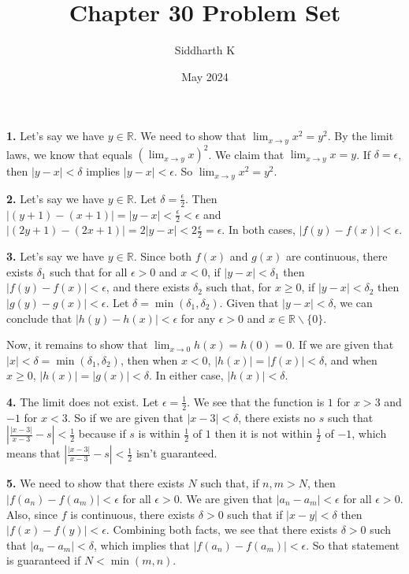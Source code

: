\documentclass{article}
\title{Chapter 30 Problem Set}
\author{Siddharth K}
\date{May 2024}
\begin{document}
\maketitle

\textbf{1.} Let's say we have $y \in \mathbb{R}$. We need to show that $\displaystyle\lim_{x \to y} x^2 = y^2$. By the limit laws, we know that equals $\displaystyle(\lim_{x \to y} x)^2$. We claim that $\displaystyle\lim_{x \to y} x = y$. If $\delta = \epsilon$, then $|y - x| < \delta$ implies $|y - x| < \epsilon$. So $\displaystyle\lim_{x \to y} x^2 = y^2$.
\newline

\textbf{2.} Let's say we have $y \in \mathbb{R}$. Let $\delta = \frac{\epsilon}{2}$. Then $|(y + 1) - (x + 1)| = |y - x| < \frac{\epsilon}{2} < \epsilon$ and $|(2y + 1) - (2x + 1)| = 2|y - x| < 2\frac{\epsilon}{2} = \epsilon$. In both cases, $|f(y) - f(x)| < \epsilon$.
\newline

\textbf{3.} Let's say we have $y \in \mathbb{R}$. Since both $f(x)$ and $g(x)$ are continuous, there exists $\delta_1$ such that for all $\epsilon > 0$ and $x < 0$, if $|y - x| < \delta_1$ then $|f(y) - f(x)| < \epsilon$, and there exists $\delta_2$ such that, for $x \ge 0$, if $|y - x| < \delta_2$ then $|g(y) - g(x)| < \epsilon$. Let $\delta = \min(\delta_1, \delta_2)$. Given that $|y - x| < \delta$, we can conclude that $|h(y) - h(x)| < \epsilon$ for any $\epsilon > 0$ and $x \in \mathbb{R} \backslash \{0\}$.
\newline

Now, it remains to show that $\displaystyle\lim_{x \to 0} h(x) = h(0) = 0$. If we are given that $|x| < \delta = \min(\delta_1, \delta_2)$, then when $x < 0$, $|h(x)| = |f(x)| < \delta$, and when $x \ge 0$, $|h(x)| = |g(x)| < \delta$. In either case, $|h(x)| < \delta$.
\newline

\textbf{4.} The limit does not exist. Let $\epsilon = \frac{1}{2}$. We see that the function is $1$ for $x > 3$ and $-1$ for $x < 3$. So if we are given that $|x - 3| < \delta$, there exists no $s$ such that $|\frac{|x - 3|}{x - 3} - s| < \frac{1}{2}$ because if $s$ is within $\frac{1}{2}$ of $1$ then it is not within $\frac{1}{2}$ of $-1$, which means that $|\frac{|x - 3|}{x - 3} - s| < \frac{1}{2}$ isn't guaranteed.
\newline

\textbf{5.} We need to show that there exists $N$ such that, if $n, m > N$, then $|f(a_n) - f(a_m)| < \epsilon$ for all $\epsilon > 0$. We are given that $|a_n - a_m| < \epsilon$ for all $\epsilon > 0$. Also, since $f$ is continuous, there exists $\delta > 0$ such that if $|x - y| < \delta$ then $|f(x) - f(y)| < \epsilon$. Combining both facts, we see that there exists $\delta > 0$ such that $|a_n - a_m| < \delta$, which implies that $|f(a_n) - f(a_m)| < \epsilon$. So that statement is guaranteed if $N < \min(m, n)$.
\newline
\end{document}
